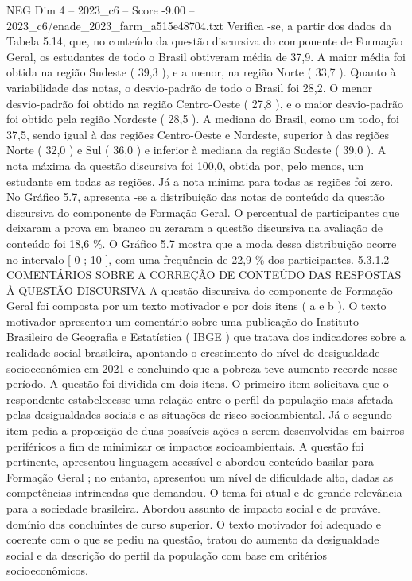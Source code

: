\begin{textsample}{NEG Dim 4 – 2023\_c6 – Score -9.00 – 2023\_c6/enade\_2023\_farm\_a515e48704.txt}
Verifica -se, a partir dos dados da Tabela 5.14, que, no conteúdo da questão discursiva do componente de Formação Geral, os estudantes de todo o Brasil obtiveram média de 37,9.
A maior média foi obtida na região Sudeste ( 39,3 ), e a menor, na região Norte ( 33,7 ).
Quanto à variabilidade das notas, o desvio-padrão de todo o Brasil foi 28,2.
O menor desvio-padrão foi obtido na região Centro-Oeste ( 27,8 ), e o maior desvio-padrão foi obtido pela região Nordeste ( 28,5 ).
A mediana do Brasil, como um todo, foi 37,5, sendo igual à das regiões Centro-Oeste e Nordeste, superior à das regiões Norte ( 32,0 ) e Sul ( 36,0 ) e inferior à mediana da região Sudeste ( 39,0 ).
A nota máxima da questão discursiva foi 100,0, obtida por, pelo menos, um estudante em todas as regiões.
Já a nota mínima para todas as regiões foi zero.
No Gráfico 5.7, apresenta -se a distribuição das notas de conteúdo da questão discursiva do componente de Formação Geral.
O percentual de participantes que deixaram a prova em branco ou zeraram a questão discursiva na avaliação de conteúdo foi 18,6 \%.
O Gráfico 5.7 mostra que a moda dessa distribuição ocorre no intervalo [ 0 ; 10 ], com uma frequência de 22,9 \% dos participantes. 5.3.1.2 COMENTÁRIOS SOBRE A CORREÇÃO DE CONTEÚDO DAS RESPOSTAS À QUESTÃO DISCURSIVA A questão discursiva do componente de Formação Geral foi composta por um texto motivador e por dois itens ( a e b ).
O texto motivador apresentou um comentário sobre uma publicação do Instituto Brasileiro de Geografia e Estatística ( IBGE ) que tratava dos indicadores sobre a realidade social brasileira, apontando o crescimento do nível de desigualdade socioeconômica em 2021 e concluindo que a pobreza teve aumento recorde nesse período.
A questão foi dividida em dois itens.
O primeiro item solicitava que o respondente estabelecesse uma relação entre o perfil da população mais afetada pelas desigualdades sociais e as situações de risco socioambiental.
Já o segundo item pedia a proposição de duas possíveis ações a serem desenvolvidas em bairros periféricos a fim de minimizar os impactos socioambientais.
A questão foi pertinente, apresentou linguagem acessível e abordou conteúdo basilar para Formação Geral ; no entanto, apresentou um nível de dificuldade alto, dadas as competências intrincadas que demandou.
O tema foi atual e de grande relevância para a sociedade brasileira.
Abordou assunto de impacto social e de provável domínio dos concluintes de curso superior.
O texto motivador foi adequado e coerente com o que se pediu na questão, tratou do aumento da desigualdade social e da descrição do perfil da população com base em critérios socioeconômicos.

\end{textsample}
